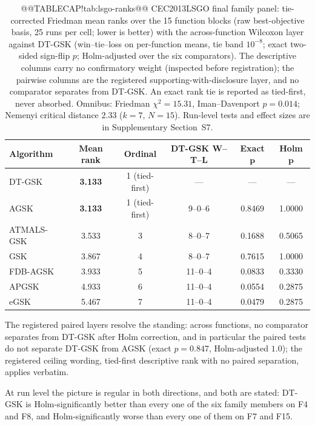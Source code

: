 \documentclass[10pt,a4paper]{article}
\newcommand{\dtgsk}{DT-GSK}
\newcommand{\atmals}{ATMALS-GSK}
\newcommand{\agsk}{AGSK}
\newcommand{\apgsk}{APGSK}
\newcommand{\fdbagsk}{FDB-AGSK}
\newcommand{\egsk}{eGSK}
\newcommand{\bestval}[1]{\textbf{#1}}
\begin{document}
\begin{table}[H]
\caption{@@TABLECAP!tab:lsgo-ranks@@ CEC2013LSGO final family panel: tie-corrected Friedman mean ranks
over the 15 function blocks (raw best-objective basis, 25 runs per cell;
lower is better) with the across-function Wilcoxon layer against \dtgsk{}
(win--tie--loss on per-function means, tie band $10^{-8}$; exact
two-sided sign-flip $p$; Holm-adjusted over the six comparators). The
descriptive columns carry no confirmatory weight (inspected before
registration); the pairwise columns are the registered
supporting-with-disclosure layer, and no comparator separates from
\dtgsk{}. An exact rank tie is reported as tied-first, never absorbed.
Omnibus: Friedman $\chi^{2} = 15.31$, Iman--Davenport $p = 0.014$;
Nemenyi critical distance $2.33$ ($k = 7$, $N = 15$). Run-level tests and
effect sizes are in Supplementary Section~S7.}\label{tab:lsgo-ranks}
\setlength{\tabcolsep}{5pt}
\begin{tabular}{lccccc}
\toprule
\textbf{Algorithm} & \textbf{Mean rank} & \textbf{Ordinal} &
\textbf{\dtgsk{} W--T--L} & \textbf{Exact} $\bm{p}$ & \textbf{Holm} $\bm{p}$ \\
\midrule
\dtgsk{} & \bestval{3.133} & 1 (tied-first) & --- & --- & --- \\
\agsk{} & \bestval{3.133} & 1 (tied-first) & 9--0--6 & 0.8469 & 1.0000 \\
\atmals{} & 3.533 & 3 & 8--0--7 & 0.1688 & 0.5065 \\
GSK & 3.867 & 4 & 8--0--7 & 0.7615 & 1.0000 \\
\fdbagsk{} & 3.933 & 5 & 11--0--4 & 0.0833 & 0.3330 \\
\apgsk{} & 4.933 & 6 & 11--0--4 & 0.0554 & 0.2875 \\
\egsk{} & 5.467 & 7 & 11--0--4 & 0.0479 & 0.2875 \\
\bottomrule
\end{tabular}




\end{table}
The registered paired layers resolve the standing: across functions, no
comparator separates from \dtgsk{} after Holm correction, and in
particular the paired tests do not separate \dtgsk{} from \agsk{} (exact
$p = 0.847$, Holm-adjusted $1.0$); the registered ceiling wording,
tied-first descriptive rank with no paired separation, applies verbatim.

At run level the picture is regular in both directions, and both are
stated: \dtgsk{} is Holm-significantly better than every one of the six
family members on F4 and F8, and Holm-significantly worse than every one
of them on F7 and F15.
\end{document}
